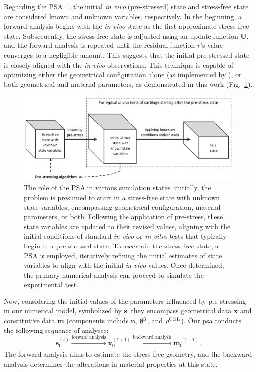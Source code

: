 \documentclass[12pt,a4paper]{report}
\begin{document}
Regarding the PSA [\cite{bols2013}], the initial \textit{in vivo} (pre-stressed) state and stress-free state are considered known and unknown variables, respectively. In the beginning, a forward analysis begins with the \textit{in vivo} state as the first approximate stress-free state. Subsequently, the stress-free state is adjusted using an update function $\textbf{U}$, and the forward analysis is repeated until the residual function $r$'s value converges to a negligible amount. This suggests that the initial pre-stressed state is closely aligned with the \textit{in vivo} observations. This technique is capable of optimizing either the geometrical configuration alone (as implemented by \cite{wang2018}), or both geometrical and material parameters, as demonstrated in this work (Fig.~\ref{fig:psa_chart}).
%
\begin{figure}
\includegraphics[width=\textwidth]{img/psa_chart.png}
\caption{The role of the PSA in various simulation states: initially, the problem is presumed to start in a stress-free state with unknown state variables, encompassing geometrical configuration, material parameters, or both. Following the application of pre-stress, these state variables are updated to their revised values, aligning with the initial conditions of standard \textit{in vivo} or \textit{in vitro} tests that typically begin in a pre-stressed state. To ascertain the stress-free state, a PSA is employed, iteratively refining the initial estimates of state variables to align with the initial \textit{in vivo} values. Once determined, the primary numerical analysis can proceed to simulate the experimental test.}
\label{fig:psa_chart}
\end{figure}

Now, considering the initial values of the parameters influenced by pre-stressing in our numerical model, symbolized by $\mathbf{s}$, they encompass geometrical data $\mathbf{x}$ and constitutive data $\mathbf{m}$ (components include $\mathbf{n}$, $\emptyset^{\rm{S}}$, and $\rho^{\rm{COL}}$). Our \ac{psa} conducts the following sequence of analyses:
%
\begin{equation}\label{eq:optimizer}
    \mathbf{s}_{0}^{(t)} \xrightarrow[]{\text{forward analysis}} \mathbf{x}_{0}^{(t+1)} \xrightarrow[]{\text{backward analysis}} \mathbf{m}_{0}^{(t+1)}.
\end{equation}
%
The forward analysis aims to estimate the stress-free geometry, and the backward analysis determines the alterations in material properties at this state.
\end{document}
